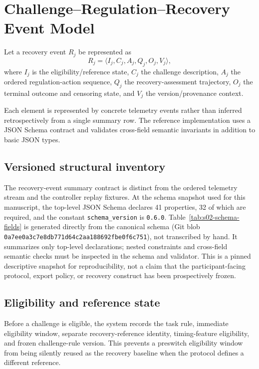 \section{Challenge--Regulation--Recovery Event Model}

Let a recovery event $R_j$ be represented as
\[
R_j = \langle I_j, C_j, A_j, Q_j, O_j, V_j \rangle,
\]
where $I_j$ is the eligibility/reference state, $C_j$ the challenge description, $A_j$ the ordered regulation-action sequence, $Q_j$ the recovery-assessment trajectory, $O_j$ the terminal outcome and censoring state, and $V_j$ the version/provenance context.

Each element is represented by concrete telemetry events rather than inferred retrospectively from a single summary row. The reference implementation uses a JSON Schema contract and validates cross-field semantic invariants in addition to basic JSON types.

\subsection{Versioned structural inventory}
The recovery-event summary contract is distinct from the ordered telemetry stream and the controller replay fixtures. At the schema snapshot used for this manuscript, the top-level JSON Schema declares 41 properties, 32 of which are required, and the constant \texttt{schema\_version} is \texttt{0.6.0}. Table~\ref{tab:s02-schema-fields} is generated directly from the canonical schema (Git blob \texttt{0a7ee0a3c7e8db771d64c2aa188692fbe0f6c751}), not transcribed by hand. It summarizes only top-level declarations; nested constraints and cross-field semantic checks must be inspected in the schema and validator. This is a pinned descriptive snapshot for reproducibility, not a claim that the participant-facing protocol, export policy, or recovery construct has been prospectively frozen.



\subsection{Eligibility and reference state}
Before a challenge is eligible, the system records the task rule, immediate eligibility window, separate recovery-reference identity, timing-feature eligibility, and frozen challenge-rule version. This prevents a preswitch eligibility window from being silently reused as the recovery baseline when the protocol defines a different reference.


